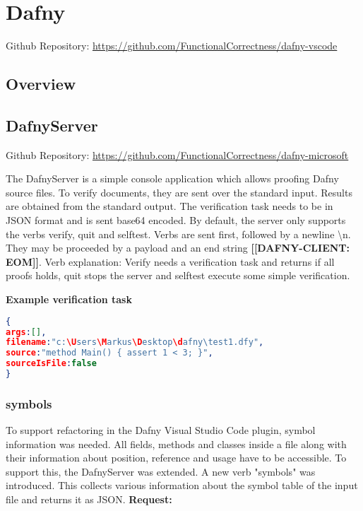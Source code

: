 \section{Dafny}


Github Repository: \href{https://github.com/FunctionalCorrectness/dafny-vscode}{https://github.com/FunctionalCorrectness/dafny-vscode}

\subsection{Overview}



\subsection{DafnyServer}
Github Repository: \href{https://github.com/FunctionalCorrectness/dafny-microsoft}{https://github.com/FunctionalCorrectness/dafny-microsoft}

The DafnyServer is a simple console application which allows proofing Dafny source files. To verify documents, they are sent over the standard input. Results are obtained from the standard output. The verification task needs to be in JSON format  and is sent base64 encoded. By default, the server only supports the verbs verify, quit and selftest. Verbs are sent first, followed by a newline \textbackslash{n}. They may be proceeded by a payload and an end string \textbf{[[DAFNY-CLIENT: EOM]]}. \newline 
Verb explanation: Verify needs a verification task and returns if all proofs holds, quit stops the server and selftest execute some simple verification. \newline

\textbf{Example verification task}
\begin{lstlisting}[language=json,firstnumber=1]
{
args:[],
filename:"c:\Users\Markus\Desktop\dafny\test1.dfy",
source:"method Main() {	assert 1 < 3; }",
sourceIsFile:false
}

\end{lstlisting}

\subsubsection{symbols}
To support refactoring in the Dafny Visual Studio Code plugin, symbol information was needed. All fields, methods and classes inside a file along with their information about position, reference and usage have to be accessible. To support this, the DafnyServer was extended. A new verb "symbols" was introduced. This collects various information about the symbol table of the input file and returns it as JSON. 
\newline\newline
\textbf{Request: }


